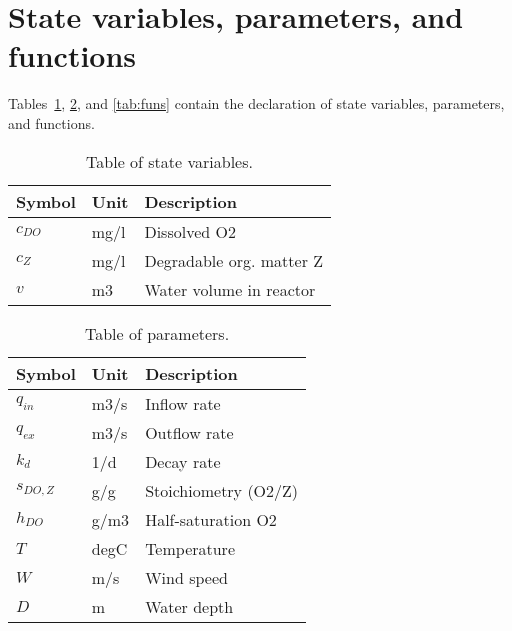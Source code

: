\documentclass[a4paper,10pt]{article}
\begin{document}


\tableofcontents




\section{State variables, parameters, and functions}

Tables~\ref{tab:vars}, \ref{tab:pars}, and \ref{tab:funs} contain the declaration of state variables, parameters, and functions.

\begin{table}[!h]
  \caption{Table of state variables. \label{tab:vars}}
  \begin{center}
  \begin{tabular}{lll}\hline
    \textbf{Symbol} & \textbf{Unit} & \textbf{Description} \\ \hline
    $c_{DO}$ & mg/l & Dissolved O2 \\
    $c_Z$ & mg/l & Degradable org. matter Z \\
    $v$ & m3 & Water volume in reactor \\ \hline
  \end{tabular}  \end{center}
\end{table}

\begin{table}[!h]
  \caption{Table of parameters. \label{tab:pars}}
  \begin{center}
  \begin{tabular}{lll}\hline
    \textbf{Symbol} & \textbf{Unit} & \textbf{Description} \\ \hline
    $q_{in}$ & m3/s & Inflow rate \\
    $q_{ex}$ & m3/s & Outflow rate \\
    $k_d$ & 1/d & Decay rate \\
    $s_{DO,Z}$ & g/g & Stoichiometry (O2/Z) \\
    $h_{DO}$ & g/m3 & Half-saturation O2 \\
    $T$ & degC & Temperature \\
    $W$ & m/s & Wind speed \\
    $D$ & m & Water depth \\ \hline
  \end{tabular}  \end{center}
\end{table}
\end{document}
